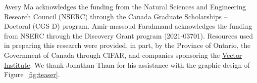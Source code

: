 Avery Ma acknowledges the funding from the Natural Sciences and Engineering Research Council (NSERC) through the Canada Graduate Scholarships – Doctoral (CGS D) program. 
% 
Amir-massoud Farahmand acknowledges the funding from NSERC through the Discovery Grant program (2021-03701). 
% 
%
Resources used in preparing this research were provided, in part, by the Province of Ontario, the Government of Canada through CIFAR, and companies sponsoring the \href{http://www.vectorinstitute.ai/partners}{Vector Institute}. 
% 
We thank Jonathan Tham for his assistance with the graphic design of Figure~\ref{fig:teaser}. 